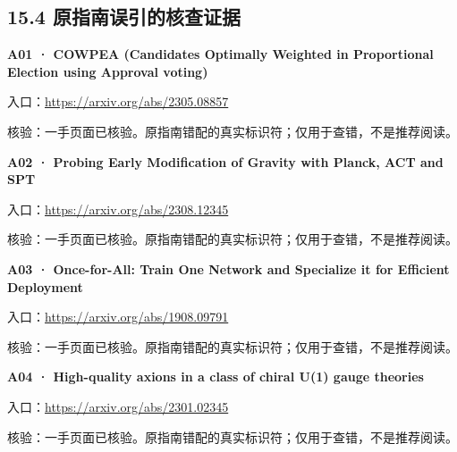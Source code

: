 \subsection{15.4
原指南误引的核查证据}\label{ux539fux6307ux5357ux8befux5f15ux7684ux6838ux67e5ux8bc1ux636e}

\par\noindent\begin{minipage}{\linewidth}
\textbf{A01 · COWPEA (Candidates Optimally Weighted in Proportional
Election using Approval voting)}

入口：\url{https://arxiv.org/abs/2305.08857}

核验：一手页面已核验。原指南错配的真实标识符；仅用于查错，不是推荐阅读。
\end{minipage}\par\vspace{6pt}

\par\noindent\begin{minipage}{\linewidth}
\textbf{A02 · Probing Early Modification of Gravity with Planck, ACT and
SPT}

入口：\url{https://arxiv.org/abs/2308.12345}

核验：一手页面已核验。原指南错配的真实标识符；仅用于查错，不是推荐阅读。
\end{minipage}\par\vspace{6pt}

\par\noindent\begin{minipage}{\linewidth}
\textbf{A03 · Once-for-All: Train One Network and Specialize it for
Efficient Deployment}

入口：\url{https://arxiv.org/abs/1908.09791}

核验：一手页面已核验。原指南错配的真实标识符；仅用于查错，不是推荐阅读。
\end{minipage}\par\vspace{6pt}

\par\noindent\begin{minipage}{\linewidth}
\textbf{A04 · High-quality axions in a class of chiral U(1) gauge
theories}

入口：\url{https://arxiv.org/abs/2301.02345}

核验：一手页面已核验。原指南错配的真实标识符；仅用于查错，不是推荐阅读。
\end{minipage}\par\vspace{6pt}

